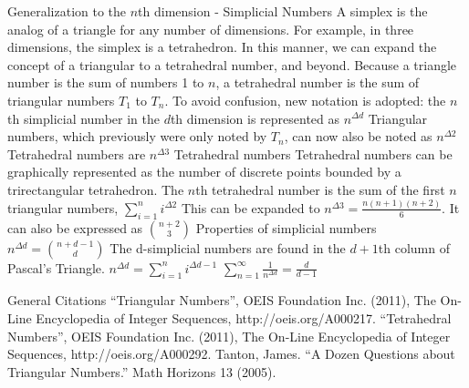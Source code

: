\documentclass{article}
\newcommand{\tri}[2] {
  #1^{\Delta #2}}
\begin{document}
\begin{outline}[enumerate]
		
\1 Generalization to the $n$th dimension - Simplicial Numbers
	\2 A simplex is the analog of a triangle for any number of dimensions. For example, in three dimensions, the simplex is a tetrahedron. In this manner, we can expand the concept of a triangular to a tetrahedral number, and beyond. Because a triangle number is the sum of numbers 1 to $n$, a tetrahedral number is the sum of triangular numbers $T_1$ to $T_n$.
	\2 To avoid confusion, new notation is adopted: the $n$th simplicial number in the $d$th dimension is represented as $\tri{n}{d}$
		\3 Triangular numbers, which previously were only noted by $T_n$, can now also be noted as $\tri{n}{2}$
		\3 Tetrahedral numbers are $\tri{n}{3}$
	\2 Tetrahedral numbers
		\3 Tetrahedral numbers can be graphically represented as the number of discrete points bounded by a trirectangular tetrahedron.
		\3 The $n$th tetrahedral number is the sum of the first $n$ triangular numbers, $\sum_{i=1}^n \tri{i}{2}$
		\3 This can be expanded to $\tri{n}{3} = \frac{n(n+1)(n+2)}{6}$.
		\3 It can also be expressed as ${n+2 \choose 3}$
	\2 Properties of simplicial numbers
		\3 $\tri{n}{d} = {n+d-1 \choose d}$
		\3 The d-simplicial numbers are found in the $d+1$th column of Pascal's Triangle.
		\3 $\tri{n}{d} = \sum_{i=1}^{n} \tri{i}{d-1}$
		\3 $\sum_{n=1}^{\infty} \frac{1}{\tri{n}{d}} = \frac{d}{d-1}$
		
		
		
\1 General Citations
	\2 ``Triangular Numbers'', OEIS Foundation Inc. (2011), The On-Line Encyclopedia of Integer Sequences, http://oeis.org/A000217.
	\2 ``Tetrahedral Numbers'', OEIS Foundation Inc. (2011), The On-Line Encyclopedia of Integer Sequences, http://oeis.org/A000292.
	\2 Tanton, James. ``A Dozen Questions about Triangular Numbers.'' Math Horizons 13 (2005).
			
\end{outline}
\end{document}
